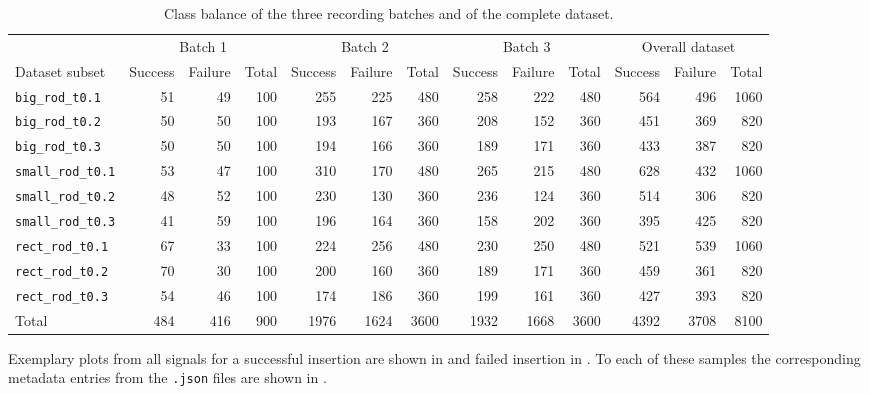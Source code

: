 \begin{table}[htbp]
    \centering
    \caption{Class balance of the three recording batches and of the complete dataset.}
    \label{tab:all_batches_classbalance}
    \begin{adjustbox}{max width=\textwidth}
    \begin{tabular}{lrrrrrrrrrrrr}
        \toprule
        & \multicolumn{3}{c}{Batch 1} 
        & \multicolumn{3}{c}{Batch 2} 
        & \multicolumn{3}{c}{Batch 3}
        & \multicolumn{3}{c}{Overall dataset} \\
        \cmidrule(lr){2-4} \cmidrule(lr){5-7} \cmidrule(lr){8-10} \cmidrule(lr){11-13}
        Dataset subset & Success & Failure & Total & Success & Failure & Total & Success & Failure & Total & Success & Failure & Total \\
        \midrule
        \texttt{big\_rod\_t0.1}   & 51 & 49 & 100 & 255 & 225 & 480 & 258 & 222 & 480 & 564 & 496 & 1060 \\
        \texttt{big\_rod\_t0.2}   & 50 & 50 & 100 & 193 & 167 & 360 & 208 & 152 & 360 & 451 & 369 & 820 \\
        \texttt{big\_rod\_t0.3}   & 50 & 50 & 100 & 194 & 166 & 360 & 189 & 171 & 360 & 433 & 387 & 820 \\
        \texttt{small\_rod\_t0.1} & 53 & 47 & 100 & 310 & 170 & 480 & 265 & 215 & 480 & 628 & 432 & 1060 \\
        \texttt{small\_rod\_t0.2} & 48 & 52 & 100 & 230 & 130 & 360 & 236 & 124 & 360 & 514 & 306 & 820 \\
        \texttt{small\_rod\_t0.3} & 41 & 59 & 100 & 196 & 164 & 360 & 158 & 202 & 360 & 395 & 425 & 820 \\
        \texttt{rect\_rod\_t0.1}  & 67 & 33 & 100 & 224 & 256 & 480 & 230 & 250 & 480 & 521 & 539 & 1060 \\
        \texttt{rect\_rod\_t0.2}  & 70 & 30 & 100 & 200 & 160 & 360 & 189 & 171 & 360 & 459 & 361 & 820 \\
        \texttt{rect\_rod\_t0.3}  & 54 & 46 & 100 & 174 & 186 & 360 & 199 & 161 & 360 & 427 & 393 & 820 \\
        \midrule
        Total & 484 & 416 & 900 & 1976 & 1624 & 3600 & 1932 & 1668 & 3600 & 4392 & 3708 & 8100 \\
        \bottomrule
    \end{tabular}
    \end{adjustbox}
\end{table}

Exemplary plots from all signals for a successful insertion are shown in  and failed insertion in . To each of these samples the corresponding metadata entries from the \texttt{.json} files are shown in .

